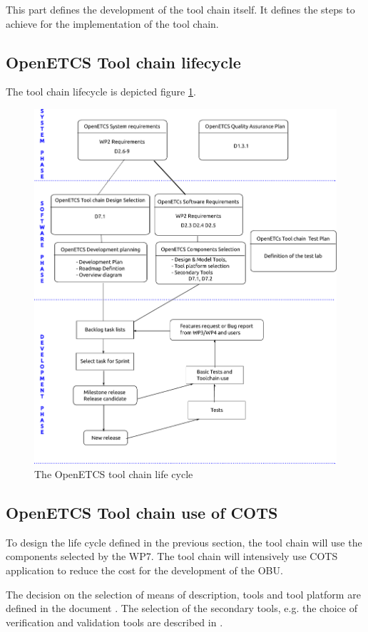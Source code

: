 This part defines the development of the tool chain itself. It defines
the steps to achieve for the implementation of the tool chain.

\subsection{OpenETCS Tool chain lifecycle}
The tool chain lifecycle is depicted figure  \ref{fig:TC_lifecycle}.
\begin{figure}[htbp]
\centering
  \includegraphics[width=.8\textwidth]{toolchain_lifecycle}
  \caption{The OpenETCS tool chain life cycle}
  \label{fig:TC_lifecycle}
\end{figure}
\subsection{OpenETCS Tool chain use of \gls{COTS}}
To design the life cycle defined in the previous section, the tool chain will
use the components selected by the WP7.  The tool chain will intensively use 
\gls{COTS} application to reduce   the cost for the development of the
\gls{OBU}.

The decision on the selection of means of description, tools and tool platform
are defined in the document \cite{D7.1}. The selection of the secondary tools,
e.g. the choice of verification and validation tools are described in \cite{D7.2}.

